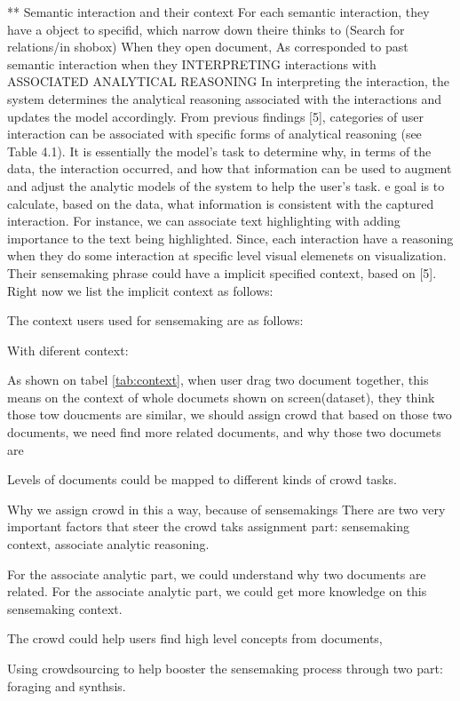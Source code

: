 \documentclass[journal]{vgtc}                %
\begin{document}
** Semantic interaction and their context
For each semantic interaction, they have a object to specifid, which narrow down theire thinks to (Search for relations/in shobox)
When they open document,
As corresponded to past semantic interaction when they INTERPRETING interactions with ASSOCIATED ANALYTICAL REASONING
In interpreting the interaction, the system determines the analytical reasoning associated with the interactions and updates the model accordingly. From previous findings [5], categories of user interaction can be associated with specific forms of analytical reasoning (see Table 4.1). It is essentially the model’s task to determine why, in terms of the data, the interaction occurred, and how that information can be used to augment and adjust the analytic models of the system to help the user’s task. e goal is to calculate, based on the data, what information is consistent with the captured interaction. For instance, we can associate text highlighting with adding importance to the text being highlighted.
Since, each interaction have a reasoning when they do some interaction at specific level visual elemenets on visualization.
Their sensemaking phrase could have a implicit specified context, based on [5].
Right now we list the implicit context as follows:

The context users used for sensemaking are as follows:

With diferent context:

As shown on tabel \autoref{tab:context}, when user drag two document together, this means on the context of whole documets shown on screen(dataset), they think those tow doucments are similar, we should assign crowd that based on those two documents, we need find more related documents,
and why those two documets are

Levels of documents could be mapped to different kinds of crowd tasks.

Why we assign crowd in this a way, because of sensemakings
There are two very important factors that steer the crowd taks assignment part: sensemaking context, associate analytic reasoning.

For the associate analytic part, we could understand why two documents are related.
For the associate analytic part, we could get more knowledge on this sensemaking context.

The crowd could help users find high level concepts from documents,

Using crowdsourcing to help booster the sensemaking process through two part: foraging and synthsis.
\end{document}
